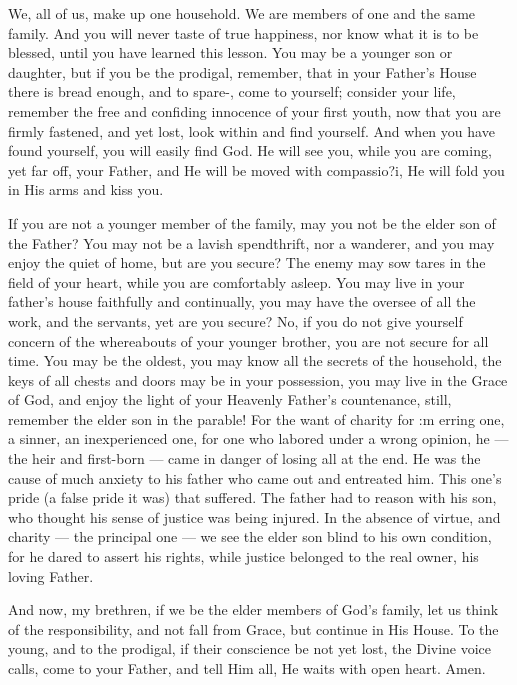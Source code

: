 We, all of us, make up one household. We 
are members of one and the same family. And 
you will never taste of true happiness, nor 
know what it is to be blessed, until you have 
learned this lesson. You may be a younger 
son or daughter, but if you be the prodigal, 
remember, that in your Father's House there is 
bread enough, and to spare-, come to yourself; 
consider your life, remember the free and confiding
innocence of your first youth, now that 
you are firmly fastened, and yet lost, look within 
and find yourself. And when you have found 
yourself, you will easily find God. He will see 
you, while you are coming, yet far off, your
Father, and He will be moved with compassio?i, 
He will fold you in His arms and kiss you. 

If you are not a younger member of the 
family, may you not be the elder son of the 
Father? You may not be a lavish spendthrift, 
nor a wanderer, and you may enjoy the quiet 
of home, but are you secure? The enemy may 
sow tares in the field of your heart, while you 
are comfortably asleep. You may live in your 
father's house faithfully and continually, you 
may have the oversee of all the work, and the 
servants, yet are you secure? No, if you do not 
give yourself concern of the whereabouts of 
your younger brother, you are not secure for 
all time. You may be the oldest, you may 
know all the secrets of the household, the keys 
of all chests and doors may be in your possession,
you may live in the Grace of God, and 
enjoy the light of your Heavenly Father's 
countenance, still, remember the elder son in the 
parable! For the want of charity for :m erring 
one, a sinner, an inexperienced one, for one 
who labored under a wrong opinion, he — the 
heir and first-born — came in danger of losing 
all at the end. He was the cause of much 
anxiety to his father who came out and entreated
him. This one's pride (a false pride it
was) that suffered. The father had to reason 
with his son, who thought his sense of justice 
was being injured. In the absence of virtue, 
and charity — the principal one — we see the 
elder son blind to his own condition, for he 
dared to assert his rights, while justice belonged 
to the real owner, his loving Father. 

And now, my brethren, if we be the elder 
members of God's family, let us think of the 
responsibility, and not fall from Grace, but continue
in His House. To the young, and to the 
prodigal, if their conscience be not yet lost, the 
Divine voice calls, come to your Father, and 
tell Him all, He waits with open heart. Amen.

